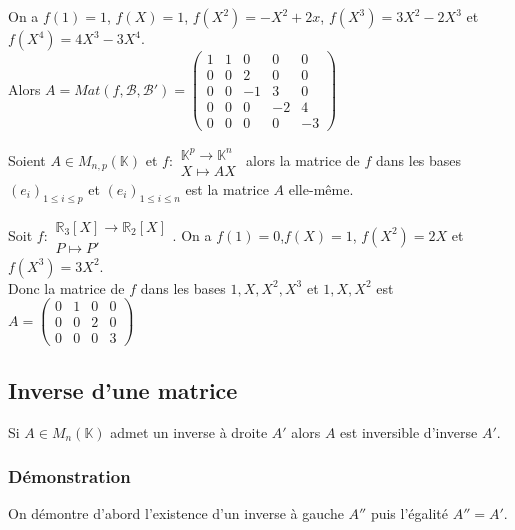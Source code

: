 \documentclass[a4paper,10pt]{book} %
\newcommand{\R}{\mathbb{R}}
\newcommand{\K}{\mathbb{K}}
\newcommand{\B}{\mathcal{B}}
\begin{document}
On a $f(1)=1$, $f(X)=1$, $f(X^2)=-X^2+2x$, $f(X^3)=3X^2-2X^3$ et $f(X^4)=4X^3-3X^4$.\\

Alors $A=Mat(f,\B,\B')=\begin{pmatrix}
1 & 1 & 0  & 0  & 0 \\
0 & 0 & 2  & 0  & 0 \\
0 & 0 & -1 & 3  & 0 \\
0 & 0 & 0  & -2 & 4 \\
0 & 0 & 0  & 0  & -3
\end{pmatrix}$

\bigskip\bigskip\bigskip

Soient $A \in M_{n,p}(\K)$ et $f:\begin{matrix}\K^p\rightarrow \K^n\\X\mapsto AX\end{matrix}$ alors la matrice de $f$ dans les bases $(e_i)_{1\leq i\leq p}$ et $(e_i)_{1\leq i\leq n}$ est la matrice $A$ elle-même.\\

\bigskip\bigskip\bigskip

Soit $f:\begin{matrix}\R_3[X] \rightarrow \R_2[X]\\P\mapsto P'\end{matrix}$.
On a $f(1)=0$,$f(X)=1$, $f(X^2)=2X$ et $f(X^3)=3X^2$.\\

Donc la matrice de $f$ dans les bases $1,X,X^2,X^3$ et $1,X,X^2$ est $A=\begin{pmatrix}
0 & 1 & 0 & 0 \\
0 & 0 & 2 & 0\\
0 & 0 & 0 & 3
\end{pmatrix}$

\newpage

\subsection{Inverse d'une matrice}
Si $A\in M_n(\K)$ admet un inverse à droite $A'$ alors $A$ est inversible d'inverse $A'$.

\subsubsection{Démonstration}
On démontre d'abord l'existence d'un inverse à gauche $A''$ puis l'égalité $A''=A'$.\\
\end{document}
